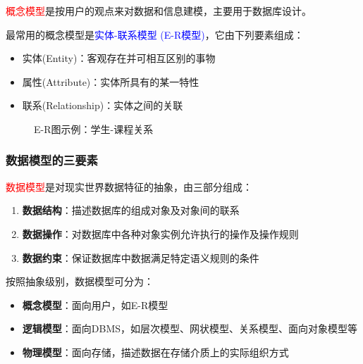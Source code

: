 \documentclass{../../note}
\begin{document}
\textcolor{red}{概念模型}是按用户的观点来对数据和信息建模，主要用于数据库设计。

最常用的概念模型是\textcolor{blue}{实体-联系模型 (E-R模型)}，它由下列要素组成：
\begin{itemize}
  \item 实体(Entity)：客观存在并可相互区别的事物
  \item 属性(Attribute)：实体所具有的某一特性
  \item 联系(Relationship)：实体之间的关联
\end{itemize}

\begin{figure}[h]
  \centering
  \caption{E-R图示例：学生-课程关系}
\end{figure}

\subsubsection{数据模型的三要素}

\textcolor{red}{数据模型}是对现实世界数据特征的抽象，由三部分组成：

\begin{enumerate}
  \item \textbf{数据结构}：描述数据库的组成对象及对象间的联系
  \item \textbf{数据操作}：对数据库中各种对象实例允许执行的操作及操作规则
  \item \textbf{数据约束}：保证数据库中数据满足特定语义规则的条件
\end{enumerate}

按照抽象级别，数据模型可分为：
\begin{itemize}
  \item \textbf{概念模型}：面向用户，如E-R模型
  \item \textbf{逻辑模型}：面向DBMS，如层次模型、网状模型、关系模型、面向对象模型等
  \item \textbf{物理模型}：面向存储，描述数据在存储介质上的实际组织方式
\end{itemize}
\end{document}
